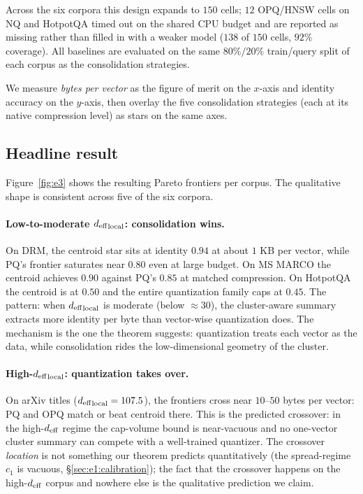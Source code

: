 Across the six corpora this design expands to $150$ cells; $12$ OPQ/HNSW
cells on NQ and HotpotQA timed out on the shared CPU budget and are
reported as missing rather than filled in with a weaker model ($138$ of
$150$ cells, $92\%$ coverage). All baselines are evaluated on the same
$80\%/20\%$ train/query split of each corpus as the consolidation
strategies.

We measure \emph{bytes per vector} as the figure of merit on the
$x$-axis and identity accuracy on the $y$-axis, then overlay the five
consolidation strategies (each at its native compression level) as
stars on the same axes.

\subsection{Headline result}
\label{sec:e3:result}

Figure~\ref{fig:e3} shows the resulting Pareto frontiers per corpus. The
qualitative shape is consistent across five of the six corpora.

\paragraph{Low-to-moderate ${d_{\mathrm{eff}}}_{\mathrm{local}}$: consolidation wins.}
On DRM, the centroid star sits at identity $0.94$ at about $1$ KB per
vector, while PQ's frontier saturates near $0.80$ even at large
budget. On MS MARCO the centroid achieves $0.90$ against PQ's $0.85$
at matched compression. On HotpotQA the centroid is at $0.50$ and the
entire quantization family caps at $0.45$. The pattern: when
${d_{\mathrm{eff}}}_{\mathrm{local}}$ is moderate (below $\approx 30$), the
cluster-aware summary extracts more identity per byte than
vector-wise quantization does. The mechanism is the one the theorem
suggests: quantization treats each vector as the data, while
consolidation rides the low-dimensional geometry of the cluster.

\paragraph{High-${d_{\mathrm{eff}}}_{\mathrm{local}}$: quantization takes over.} On
arXiv titles (${d_{\mathrm{eff}}}_{\mathrm{local}} = 107.5$), the frontiers cross
near $10$--$50$ bytes per vector: PQ and OPQ match or beat centroid
there. This is the predicted crossover: in the high-${d_{\mathrm{eff}}}$ regime the
cap-volume bound is near-vacuous and no one-vector cluster summary can
compete with a well-trained quantizer. The crossover \emph{location}
is not something our theorem predicts quantitatively (the spread-regime
$c_1$ is vacuous, \S\ref{sec:e1:calibration}); the fact that the
crossover happens on the high-${d_{\mathrm{eff}}}$ corpus and nowhere else is the
qualitative prediction we claim.

